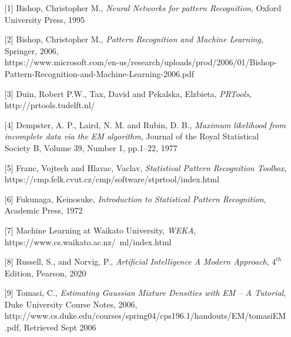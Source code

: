 \documentclass{article}
\begin{document}
\begin{enumerate}
\begin{enumerate} 
	\item[{[1]}] Bishop, Christopher M., \textit{Neural Networks for pattern Recognition}, Oxford University Press, 1995 
	\item[{[2]}] Bishop, Christopher M., \textit{Pattern Recognition and Machine Learning}, Springer, 2006, \\
	https://www.microsoft.com/en-us/research/uploads/prod/2006/01/Bishop-Pattern-Recognition-and-Machine-Learning-2006.pdf
	\item[{[3]}] Duin, Robert P.W., Tax, David and Pekalska, Elzbieta, \textit{PRTools}, http://prtools.tudelft.nl/
	\item[{[4]}] Dempster, A. P., Laird, N. M. and Rubin, D. B., \textit{Maximum likelihood from incomplete data via the EM algorithm}, Journal of the Royal Statistical Society B, Volume 39, Number 1, pp.1–22, 1977
	\item[{[5]}] Franc, Vojtech and Hlavac, Vaclav, \textit{Statistical Pattern Recognition Toolbox}, \newline https://cmp.felk.cvut.cz/cmp/software/stprtool/index.html
	\item[{[6]}] Fukunaga, Keinosuke, \textit{Introduction to Statistical Pattern Recognition}, Academic Press, 1972 
	\item[{[7]}] Machine Learning at Waikato University, \textit{WEKA}, https://www.cs.waikato.ac.nz/~ml/index.html
	\item[{[8]}] Russell, S., and Norvig, P., \textit{Artificial Intelligence A Modern Approach}, $4^{th}$ Edition, Pearson, 2020
	\item[{[9]}] Tomasi, C., \textit{Estimating Gaussian Mixture Densities with EM – A Tutorial}, Duke University Course Notes, 2006, http://www.cs.duke.edu/courses/spring04/cps196.1/handouts/EM/tomasiEM.pdf, Retrieved Sept 2006
\end{enumerate}



\end{enumerate}
\end{document}
